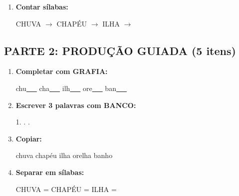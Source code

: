 \begin{exercicio}
\begin{enumerate}
  \item \textbf{Contar sílabas:}
  \begin{center}
  CHUVA $\rightarrow$ \underline{\hspace{0.9cm}} \quad CHAPÉU $\rightarrow$ \underline{\hspace{0.9cm}} \quad ILHA $\rightarrow$ \underline{\hspace{0.9cm}}
  \end{center}

\end{enumerate}

\subsection*{PARTE 2: PRODUÇÃO GUIADA (5 itens)}

\begin{enumerate}[resume]

  \item \textbf{Completar com GRAFIA:}
  \begin{center}
  chu\underline{~~~} \quad cha\underline{~~~} \quad ilh\underline{~~~} \quad ore\underline{~~~} \quad ban\underline{~~~}
  \end{center}

  \item \textbf{Escrever 3 palavras com BANCO:}
  \begin{center}
  1. \underline{\hspace{3cm}} . \underline{\hspace{3cm}} . \underline{\hspace{3cm}}
  \end{center}

  \item \textbf{Copiar:}
  \begin{center}
  chuva \quad chapéu \quad ilha \quad orelha \quad banho
  \end{center}

  \item \textbf{Separar em sílabas:}
  \begin{center}
  CHUVA = \underline{\hspace{1cm}} \underline{\hspace{1cm}} \quad CHAPÉU = \underline{\hspace{1cm}} \underline{\hspace{1cm}} \quad ILHA = \underline{\hspace{1cm}} \underline{\hspace{1cm}}
  \end{center}


\end{enumerate}
\end{exercicio}
